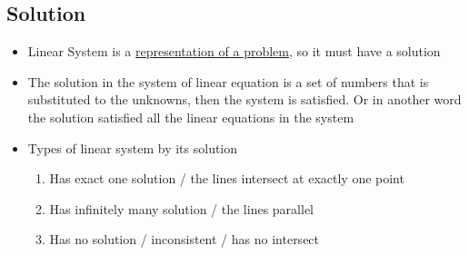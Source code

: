 \documentclass[a4paper,12pt]{article}
\begin{document}
\subsection*{Solution}
\begin{itemize}
  \item Linear System is a \underline{representation of a problem}, so it must have a solution
  \item The solution in the system of linear equation is a set of numbers that is substituted to the unknowns, then the system is satisfied. Or in another word the solution satisfied all the linear equations in the system
  \item Types of linear system by its solution
        \begin{enumerate}
          \item Has exact one solution / the lines intersect at exactly one point
          \item Has infinitely many solution / the lines parallel
          \item Has no solution / inconsistent / has no intersect
        \end{enumerate}
\end{itemize}
\end{document}
